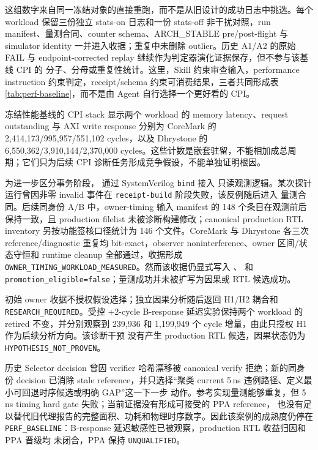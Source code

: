 \documentclass[UTF8,a4paper,zihao=-4,oneside]{ctexart}
\newcommand{\taskpath}[1]{\path{#1}}
\newcommand{\statusword}[1]{\texttt{#1}}
\begin{document}
这组数字来自同一冻结对象的直接重跑，而不是从旧设计的成功日志中挑选。每个 workload
保留三份独立 stats-on 日志和一份 stats-off 非干扰对照，run manifest、量测合同、counter
schema、ARCH\_STABLE pre/post-flight 与 simulator identity 一并进入收据；重复中未删除 outlier。历史
A1/A2 的原始 FAIL 与 endpoint-corrected replay 继续作为判定器演化证据保存，但不参与该基线 CPI 的
分子、分母或重复性统计。这里，Skill 约束审查输入，performance instruction 约束判定，receipt/schema
约束可消费结果，三者共同形成表\ref{tab:perf-baseline}，而不是由 Agent 自行选择一个更好看的 CPI。

冻结性能基线的 CPI stack 显示两个 workload 的 memory latency、request outstanding 与 AXI write
response 分别为 CoreMark 的 2,414,173/995,957/551,102 cycles，以及 Dhrystone 的
6,550,362/3,910,144/2,370,000 cycles。这些计数是嵌套驻留，不能相加成总周期；它们只为后续 CPI
诊断任务形成竞争假设，不能单独证明根因。

为进一步区分事务阶段，\taskpath{NpcOooOwnerTimingProbe.sv} 通过 SystemVerilog \texttt{bind} 接入
只读观测逻辑。某次探针运行曾因非零 invalid 事件在 \texttt{receipt-build} 阶段失败，该反例随后进入
量测合同。后续同身份 A/B 中，owner-timing 输入 manifest 的 148 个条目在观测前后保持一致，且
production filelist 未被诊断构建修改；canonical production RTL inventory 另按功能签核口径统计为
146 个文件。CoreMark 与 Dhrystone 各三次 reference/diagnostic 重复均 bit-exact，observer
noninterference、owner 区间/状态守恒和 runtime cleanup 全部通过，收据形成
\statusword{OWNER\_TIMING\_WORKLOAD\_MEASURED}。然而该收据仍显式写入
、
 和
\texttt{promotion\_eligible=false}；量测成功并未被扩写为因果或 RTL 候选成功。

初始 owner 收据不授权假设选择；独立因果分析随后返回 H1/H2 耦合和
\statusword{RESEARCH\_REQUIRED}。受控 $+2$-cycle B-response 延迟实验保持两个 workload 的 retired
不变，并分别观察到 239,936 和 1,199,949 个 cycle 增量，由此只授权 H1 作为后续分析方向。该诊断干预
没有产生 production RTL 候选，因果状态仍为 \statusword{HYPOTHESIS\_NOT\_PROVEN}。

历史 Selector decision 曾因 verifier 哈希漂移被 canonical verify 拒绝；新的同身份 decision 已消除
stale reference，并只选择“聚类 current 5\,ns 违例路径、定义最小可回退时序候选或明确 GAP”这一下一步
动作。参考实现量测能够重复，但 5\,ns timing hard gate 失败；当前证据没有形成可接受的 PPA reference，
也没有足以替代旧代理报告的完整面积、功耗和物理时序数字。因此该案例的成熟度仍停在
\statusword{PERF\_BASELINE}：B-response 延迟敏感性已被观察，production RTL 收益归因和 PPA 晋级均
未闭合，PPA 保持 \statusword{UNQUALIFIED}。
\end{document}

